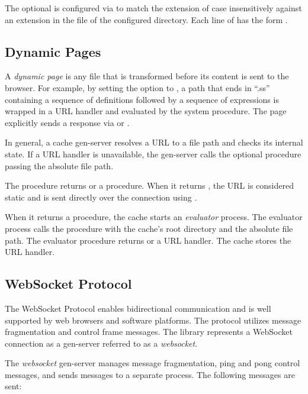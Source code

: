 The optional  is configured via
 to match the extension of
 case insensitively against an extension in the
 file of the configured directory. Each line of
 has the form
.

\subsection{Dynamic Pages}\label{sec:dynamic-pages}

A \emph{dynamic page} is any file that is transformed before its
content is sent to the browser. For example, by setting the option
 to , a path that
ends in ``.ss'' containing a sequence of definitions followed by a
sequence of expressions is wrapped in a URL handler and evaluated by
the  system procedure. The page explicitly sends a response
via  or .

In general, a cache gen-server resolves a URL to a file path and
checks its internal state. If a URL handler is unavailable, the
gen-server calls the optional  procedure passing
the absolute file path.

The  procedure returns  or a
procedure. When it returns , the URL is considered static
and is sent directly over the connection using
.

When it returns a procedure, the cache starts an \emph{evaluator}
process. The evaluator process calls the procedure with the cache's
root directory and the absolute file path. The evaluator procedure
returns  or a URL handler. The cache stores the URL handler.

\subsection{WebSocket Protocol}\label{sec:websocket-protocol}

The WebSocket Protocol enables bidirectional communication and is well
supported by web browsers and software platforms.  The protocol
utilizes message fragmentation and control frame messages.  The
 library represents a WebSocket connection as
a gen-server referred to as a \emph{websocket}.

The \emph{websocket} gen-server manages message fragmentation, ping
and pong control messages, and sends messages to a separate
process. The following messages are sent:

